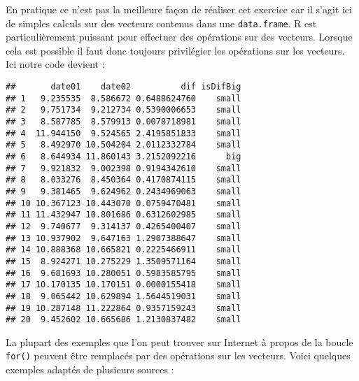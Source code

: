 \documentclass[]{book}
\newenvironment{Shaded}{\begin{snugshade}}{\end{snugshade}}
\newcommand{\KeywordTok}[1]{\textcolor[rgb]{0.13,0.29,0.53}{\textbf{#1}}}
\newcommand{\DataTypeTok}[1]{\textcolor[rgb]{0.13,0.29,0.53}{#1}}
\newcommand{\DecValTok}[1]{\textcolor[rgb]{0.00,0.00,0.81}{#1}}
\newcommand{\StringTok}[1]{\textcolor[rgb]{0.31,0.60,0.02}{#1}}
\newcommand{\OperatorTok}[1]{\textcolor[rgb]{0.81,0.36,0.00}{\textbf{#1}}}
\newcommand{\NormalTok}[1]{#1}
\theoremstyle{definition}
\theoremstyle{definition}
\theoremstyle{definition}
\theoremstyle{remark}
\begin{document}
En pratique ce n'est pas la meilleure façon de réaliser cet exercice car
il s'agit ici de simples calculs sur des vecteurs contenus dans une
\texttt{data.frame}. R est particulièrement puissant pour effectuer des
opérations sur des vecteurs. Lorsque cela est possible il faut donc
toujours privilégier les opérations sur les vecteurs. Ici notre code
devient :

\begin{Shaded}
\end{Shaded}

\begin{verbatim}
##       date01    date02          dif isDifBig
## 1   9.235535  8.586672 0.6488624760    small
## 2   9.751734  9.212734 0.5390006653    small
## 3   8.587785  8.579913 0.0078718981    small
## 4  11.944150  9.524565 2.4195851833    small
## 5   8.492970 10.504204 2.0112332784    small
## 6   8.644934 11.860143 3.2152092216      big
## 7   9.921832  9.002398 0.9194342610    small
## 8   8.033276  8.450364 0.4170874115    small
## 9   9.381465  9.624962 0.2434969063    small
## 10 10.367123 10.443070 0.0759470481    small
## 11 11.432947 10.801686 0.6312602985    small
## 12  9.740677  9.314137 0.4265400407    small
## 13 10.937902  9.647163 1.2907388647    small
## 14 10.888368 10.665821 0.2225466911    small
## 15  8.924271 10.275229 1.3509571164    small
## 16  9.681693 10.280051 0.5983585795    small
## 17 10.170135 10.170151 0.0000155418    small
## 18  9.065442 10.629894 1.5644519031    small
## 19 10.287148 11.222864 0.9357159243    small
## 20  9.452602 10.665686 1.2130837482    small
\end{verbatim}

La plupart des exemples que l'on peut trouver sur Internet à propos de
la boucle \texttt{for()} peuvent être remplacés par des opérations sur
les vecteurs. Voici quelques exemples adaptés de plusieurs sources :
\end{document}
